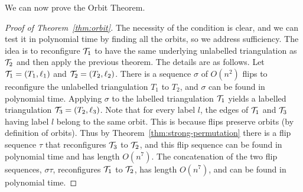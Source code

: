 
We can now prove the Orbit Theorem.

\begin{proof}[Proof of Theorem~\ref{thm:orbit}]
The necessity of the condition is clear, and we can test it in polynomial time by finding all the orbits, so we address sufficiency.
The idea
 is to reconfigure ${\cal T}_1$ to have the same underlying unlabelled triangulation as ${\cal T}_2$ and then apply the previous theorem.  The details are as follows. 
Let ${\cal T}_1 = (T_1, \ell_1)$ and ${\cal T}_2 = (T_2, \ell_2)$. 
There is a sequence $\sigma$ of $O(n^2)$ flips to reconfigure the unlabelled triangulation $T_1$ to $T_2$, and $\sigma$ can be found in polynomial time.
Applying $\sigma$ to the labelled triangulation ${\cal T}_1$ yields a labelled triangulation ${\cal T}_3 = (T_2, \ell_3)$.  
Note that for every label $l$, the edges of ${\cal T}_1$ and ${\cal T}_3$ having label $l$ belong to the same orbit.
This is because flips preserve orbits (by definition of orbits).
Thus by Theorem~\ref{thm:strong-permutation} there is a flip sequence $\tau$ that reconfigures ${\cal T}_3$ to ${\cal T}_2$, and this flip sequence can be found in polynomial time and has length $O(n^7)$.
The concatenation of the two flip sequences, $\sigma \tau$, reconfigures ${\cal T}_1$ to ${\cal T}_2$, has length $O(n^7)$, and can be found in polynomial time.  
\end{proof}
